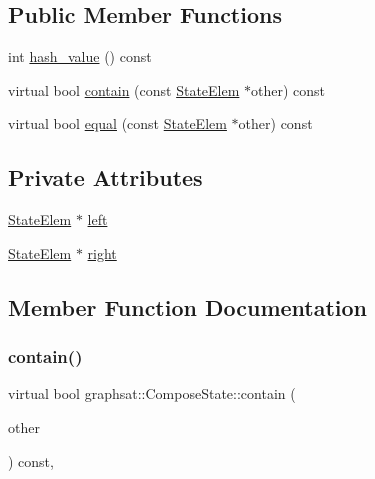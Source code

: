\subsection*{Public Member Functions}
\begin{DoxyCompactItemize}
\item 
int \mbox{\hyperlink{classgraphsat_1_1_compose_state_ae1b74f6f1f3d18694e1a8f1d83bec163}{hash\+\_\+value}} () const
\item 
virtual bool \mbox{\hyperlink{classgraphsat_1_1_compose_state_a10249606cb19be7ce9cf17f6fb2e5509}{contain}} (const \mbox{\hyperlink{classgraphsat_1_1_state_elem}{State\+Elem}} $\ast$other) const
\item 
virtual bool \mbox{\hyperlink{classgraphsat_1_1_compose_state_a0163df015711607299462617d7132d2d}{equal}} (const \mbox{\hyperlink{classgraphsat_1_1_state_elem}{State\+Elem}} $\ast$other) const
\end{DoxyCompactItemize}
\subsection*{Private Attributes}
\begin{DoxyCompactItemize}
\item 
\mbox{\hyperlink{classgraphsat_1_1_state_elem}{State\+Elem}} $\ast$ \mbox{\hyperlink{classgraphsat_1_1_compose_state_a6aacf25f514143c628bbabaa48e33d44}{left}}
\item 
\mbox{\hyperlink{classgraphsat_1_1_state_elem}{State\+Elem}} $\ast$ \mbox{\hyperlink{classgraphsat_1_1_compose_state_abefe7af28a30a92ff879dea369fff296}{right}}
\end{DoxyCompactItemize}


\subsection{Member Function Documentation}
\mbox{\label{classgraphsat_1_1_compose_state_a10249606cb19be7ce9cf17f6fb2e5509}} 
\subsubsection{\texorpdfstring{contain()}{contain()}}
{\footnotesize\ttfamily virtual bool graphsat\+::\+Compose\+State\+::contain (\begin{DoxyParamCaption}\item[{const \mbox{\hyperlink{classgraphsat_1_1_state_elem}{State\+Elem}} $\ast$}]{other }\end{DoxyParamCaption}) const\hspace{0.3cm}{\ttfamily [inline]}, {\ttfamily [virtual]}}



